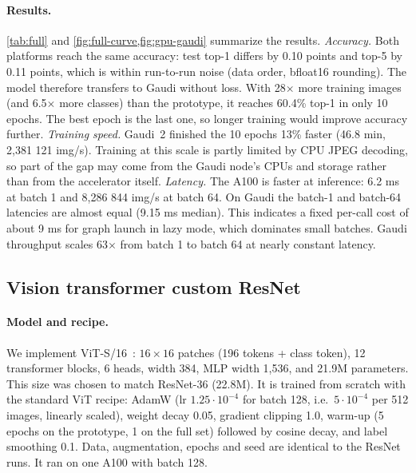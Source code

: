 \documentclass[10pt,twocolumn,letterpaper]{article}
\begin{document}
\paragraph{Results.}
\cref{tab:full} and \cref{fig:full-curve,fig:gpu-gaudi} summarize the results.
\emph{Accuracy.} Both platforms reach the same accuracy: test top-1 differs by 0.10 points and top-5 by 0.11 points, which is within run-to-run noise (data order, bfloat16 rounding). The model therefore transfers to Gaudi without loss. With 28$\times$ more training images (and 6.5$\times$ more classes) than the prototype, it reaches 60.4\% top-1 in only 10 epochs. The best epoch is the last one, so longer training would improve accuracy further.
\emph{Training speed.} Gaudi~2 finished the 10 epochs 13\% faster (46.8  min, 2{,}381 121 img/s). Training at this scale is partly limited by CPU JPEG decoding, so part of the gap may come from the Gaudi node's CPUs and storage rather than from the accelerator itself.
\emph{Latency.} The A100 is faster at inference: 6.2  ms at batch 1 and 8{,}286 844 img/s at batch 64. On Gaudi the batch-1 and batch-64 latencies are almost equal (9.15  ms median). This indicates a fixed per-call cost of about 9 ms for graph launch in lazy mode, which dominates small batches. Gaudi throughput scales 63$\times$ from batch 1 to batch 64 at nearly constant latency.


\subsection{Vision transformer \vs custom ResNet}
\label{sec:p3-5}
\paragraph{Model and recipe.}
We implement ViT-S/16~\cite{dosovitskiy2021vit,touvron2021deit}: $16{\times}16$ patches (196 tokens + class token), 12 transformer blocks, 6 heads, width 384, MLP width 1{,}536, and 21.9M parameters. This size was chosen to match ResNet-36 (22.8M). It is trained from scratch with the standard ViT recipe: AdamW (lr $1.25\cdot10^{-4}$ for batch 128, i.e.\ $5\cdot10^{-4}$ per 512 images, linearly scaled), weight decay 0.05, gradient clipping 1.0, warm-up (5 epochs on the prototype, 1 on the full set) followed by cosine decay, and label smoothing 0.1. Data, augmentation, epochs and seed are identical to the ResNet runs. It ran on one A100 with batch 128.
\end{document}
